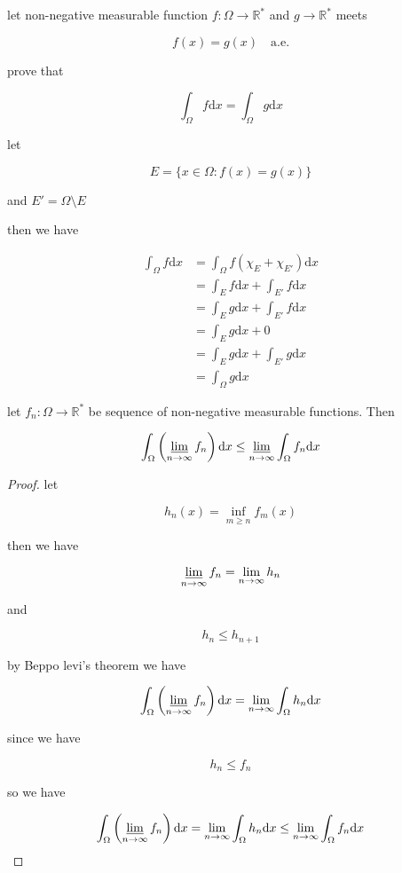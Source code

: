 \documentclass[11pt,a4paper]{article}
\begin{document}
\begin{exercise}
    let non-negative measurable function $f: \Omega \to \mathbb{R}^*$ and $g \to \mathbb{R}^*$ meets 

    \[
        f(x) = g(x)\quad \text{a.e.}
    \]

    prove that

    \[
        \int_{\Omega}f \mathrm{d}x = \int_{\Omega}g \mathrm{d}x
    \]

    let 

    \[
        E = \{ x \in \Omega : f(x) = g(x) \}
    \]

    and $E' = \Omega \setminus E$

    then we have

    \begin{align*}
        \int_{\Omega}f \mathrm{d}x &= \int_{\Omega}f(\chi_{E} + \chi_{E'}) \mathrm{d}x \\
        &= \int_{E}f \mathrm{d}x  + \int_{E'}f\mathrm{d}x \\
        &= \int_{E}g \mathrm{d}x  + \int_{E'}f\mathrm{d}x \\
        &= \int_{E}g \mathrm{d}x  + 0 \\
        &= \int_{E}g \mathrm{d}x  + \int_{E'}g\mathrm{d}x \\
        &= \int_{\Omega}g \mathrm{d}x
    \end{align*}
\end{exercise}

\begin{thm}
    let $f_n: \Omega \to \mathbb{R}^*$ be sequence of non-negative measurable functions. Then

    \[
        \int_{\Omega} \left(\varliminf_{n \to \infty} f_n \right) \mathrm{d}x \le \varliminf_{n \to \infty} \int_{\Omega} f_n \mathrm{d}x
    \]
\end{thm}

\begin{proof}
    let 

    \[
        h_n(x) = \inf_{m \ge n}f_m(x)
    \]

    then we have

    \[
        \varliminf_{n \to \infty}f_n = \lim_{n \to \infty} h_n
    \]

    and

    \[  
        h_n \le h_{n+1}
    \]

    by Beppo levi's theorem we have

    \[
\int_{\Omega} \left(\varliminf_{n \to \infty} f_n \right) \mathrm{d}x = \lim_{n \to \infty} \int_{\Omega}h_n \mathrm{d}x
    \]

    since we have

    \[
        h_n \le f_n
    \]

    so we have

    \[
\int_{\Omega} \left(\varliminf_{n \to \infty} f_n \right) \mathrm{d}x = \lim_{n \to \infty} \int_{\Omega}h_n \mathrm{d}x \le \lim_{n \to \infty} \int_{\Omega}f_n \mathrm{d}x
    \]
\end{proof}
\end{document}
